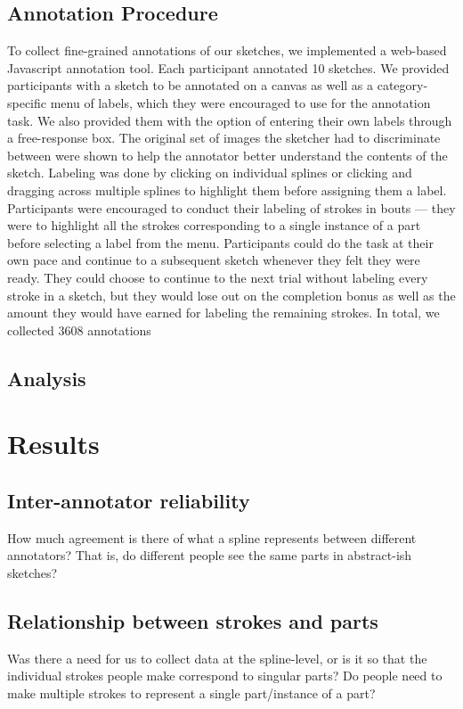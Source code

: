 \documentclass[10pt,letterpaper]{article}
\newcommand{\jefan}[1]{{\color{blue}{[jefan: #1]}}}
\begin{document}
\subsection{Annotation Procedure}

To collect fine-grained annotations of our sketches, we implemented a web-based Javascript annotation tool. 
Each participant annotated 10 sketches. 
We provided participants with a sketch to be annotated on a canvas as well as a category-specific menu of labels, which they were encouraged to use for the annotation task. We also provided them with the option of entering their own labels through a free-response box. 
The original set of images the sketcher had to discriminate between were shown to help the annotator better understand the contents of the sketch.
Labeling was done by clicking on individual splines or clicking and dragging across multiple splines to highlight them before assigning them a label.
Participants were encouraged to conduct their labeling of strokes in bouts — they were to highlight all the strokes corresponding to a single instance of a part before selecting a label from the menu. 
Participants could do the task at their own pace and continue to a subsequent sketch whenever they felt they were ready. 
They could choose to continue to the next trial without labeling every stroke in a sketch, but they would lose out on the completion bonus as well as the amount they would have earned for labeling the remaining strokes.
\noindent In total, we collected 3608 annotations

\jefan{add preprocessing details here}

\subsection{Analysis}

\section{Results}
\subsection{Inter-annotator reliability}
How much agreement is there of what a spline represents between different annotators? That is, do different people see the same parts in abstract-ish sketches?

\subsection{Relationship between strokes and parts}
Was there a need for us to collect data at the spline-level, or is it so that the individual strokes people make correspond to singular parts?
Do people need to make multiple strokes to represent a single part/instance of a part?
\end{document}
